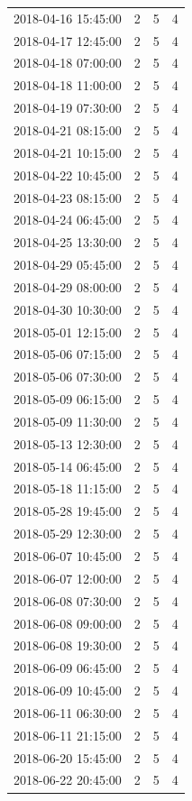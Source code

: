 \begin{tabular}{lrrr}
2018-04-16 15:45:00 & 2 & 5 & 4 \\
2018-04-17 12:45:00 & 2 & 5 & 4 \\
2018-04-18 07:00:00 & 2 & 5 & 4 \\
2018-04-18 11:00:00 & 2 & 5 & 4 \\
2018-04-19 07:30:00 & 2 & 5 & 4 \\
2018-04-21 08:15:00 & 2 & 5 & 4 \\
2018-04-21 10:15:00 & 2 & 5 & 4 \\
2018-04-22 10:45:00 & 2 & 5 & 4 \\
2018-04-23 08:15:00 & 2 & 5 & 4 \\
2018-04-24 06:45:00 & 2 & 5 & 4 \\
2018-04-25 13:30:00 & 2 & 5 & 4 \\
2018-04-29 05:45:00 & 2 & 5 & 4 \\
2018-04-29 08:00:00 & 2 & 5 & 4 \\
2018-04-30 10:30:00 & 2 & 5 & 4 \\
2018-05-01 12:15:00 & 2 & 5 & 4 \\
2018-05-06 07:15:00 & 2 & 5 & 4 \\
2018-05-06 07:30:00 & 2 & 5 & 4 \\
2018-05-09 06:15:00 & 2 & 5 & 4 \\
2018-05-09 11:30:00 & 2 & 5 & 4 \\
2018-05-13 12:30:00 & 2 & 5 & 4 \\
2018-05-14 06:45:00 & 2 & 5 & 4 \\
2018-05-18 11:15:00 & 2 & 5 & 4 \\
2018-05-28 19:45:00 & 2 & 5 & 4 \\
2018-05-29 12:30:00 & 2 & 5 & 4 \\
2018-06-07 10:45:00 & 2 & 5 & 4 \\
2018-06-07 12:00:00 & 2 & 5 & 4 \\
2018-06-08 07:30:00 & 2 & 5 & 4 \\
2018-06-08 09:00:00 & 2 & 5 & 4 \\
2018-06-08 19:30:00 & 2 & 5 & 4 \\
2018-06-09 06:45:00 & 2 & 5 & 4 \\
2018-06-09 10:45:00 & 2 & 5 & 4 \\
2018-06-11 06:30:00 & 2 & 5 & 4 \\
2018-06-11 21:15:00 & 2 & 5 & 4 \\
2018-06-20 15:45:00 & 2 & 5 & 4 \\
2018-06-22 20:45:00 & 2 & 5 & 4 \\

\end{tabular}
